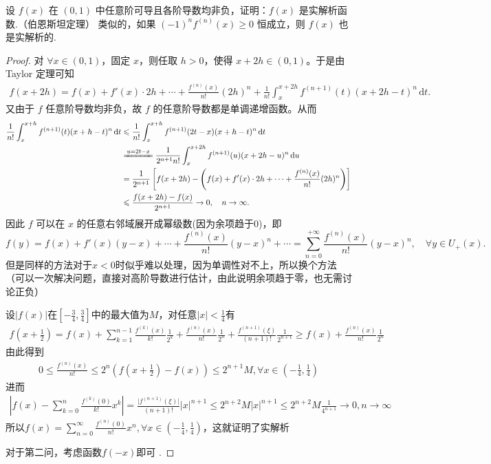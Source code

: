 \documentclass[../../main.tex]{subfiles}
\begin{document}
\begin{example}
设 \( f(x) \) 在 \( (0,1) \) 中任意阶可导且各阶导数均非负，证明：\( f(x) \) 是实解析函数.（伯恩斯坦定理） 
类似的，如果 \( (-1)^n f^{(n)}(x) \geq 0 \) 恒成立，则 \( f(x) \) 也是实解析的. 
\end{example}
\begin{proof}
对 \(\forall x \in (0,1)\)，固定 \(x\)，则任取 \(h>0\)，使得 \(x+2h \in (0,1)\)。于是由 Taylor 定理可知
\begin{align*}
f(x+2h) = f(x) + f'(x) \cdot 2h + \cdots + \frac{f^{(n)}(x)}{n!} (2h)^n + \frac{1}{n!} \int_x^{x+2h} f^{(n+1)}(t) (x+2h-t)^n \, \mathrm{d}t.
\end{align*}
又由于 \(f\) 任意阶导数均非负，故 \(f\) 的任意阶导数都是单调递增函数。从而
\begin{align*}
\frac{1}{n!} \int_x^{x+h} f^{(n+1)}(t) (x+h-t)^n \, \mathrm{d}t &\leqslant \frac{1}{n!} \int_x^{x+h} f^{(n+1)}(2t-x) (x+h-t)^n \, \mathrm{d}t \\
&\xlongequal{u=2t-x} \frac{1}{2^{n+1} n!} \int_x^{x+2h} f^{(n+1)}(u) (x+2h-u)^n \, \mathrm{d}u \\
&= \frac{1}{2^{n+1}} \left[ f(x+2h) - \left( f(x) + f'(x) \cdot 2h + \cdots + \frac{f^{(n)}(x)}{n!} (2h)^n \right) \right] \\
&\leqslant \frac{f(x+2h) - f(x)}{2^{n+1}} \to 0, \quad n \to \infty.
\end{align*}
因此 \(f\) 可以在 \(x\) 的任意右邻域展开成幂级数(因为余项趋于0)，即
\[
f(y) = f(x) + f'(x) (y-x) + \cdots + \frac{f^{(n)}(x)}{n!} (y-x)^n + \cdots = \sum_{n=0}^{+\infty} \frac{f^{(n)}(x)}{n!} (y-x)^n, \quad \forall y \in U_+(x).
\]
但是同样的方法对于\(x < 0\)时似乎难以处理，因为单调性对不上，所以换个方法（可以一次解决问题，直接对高阶导数进行估计，由此说明余项趋于零，也无需讨论正负）

设\(\vert f(x)\vert\)在\([-\frac{3}{4},\frac{3}{4}]\)中的最大值为\(M\)，对任意\(\vert x\vert<\frac{1}{4}\)有
\begin{align*}
f\left(x + \frac{1}{2}\right)=f(x)+\sum_{k = 1}^{n - 1}\frac{f^{(k)}(x)}{k!}\frac{1}{2^{k}}+\frac{f^{(n)}(x)}{n!}\frac{1}{2^{n}}+\frac{f^{(n + 1)}(\xi)}{(n + 1)!}\frac{1}{2^{n + 1}}\geq f(x)+\frac{f^{(n)}(x)}{n!}\frac{1}{2^{n}}
\end{align*}
由此得到
\begin{align*}
0\leq\frac{f^{(n)}(x)}{n!}\leq 2^{n}\left(f\left(x+\frac{1}{2}\right)-f(x)\right)\leq 2^{n + 1}M,\forall x\in\left(-\frac{1}{4},\frac{1}{4}\right)
\end{align*}
进而
\begin{align*}
\left\vert f(x)-\sum_{k = 0}^{n}\frac{f^{(k)}(0)}{k!}x^{k}\right\vert=\frac{\vert f^{(n + 1)}(\xi)\vert}{(n + 1)!}\vert x\vert^{n + 1}\leq 2^{n + 2}M\vert x\vert^{n + 1}\leq 2^{n + 2}M\frac{1}{4^{n + 1}}\to 0,n\to\infty
\end{align*}
所以\(f(x)=\sum_{n = 0}^{\infty}\frac{f^{(n)}(0)}{n!}x^{n},\forall x\in\left(-\frac{1}{4},\frac{1}{4}\right)\)，这就证明了实解析

对于第二问，考虑函数\(f(-x)\)即可 .
\end{proof}
\end{document}
